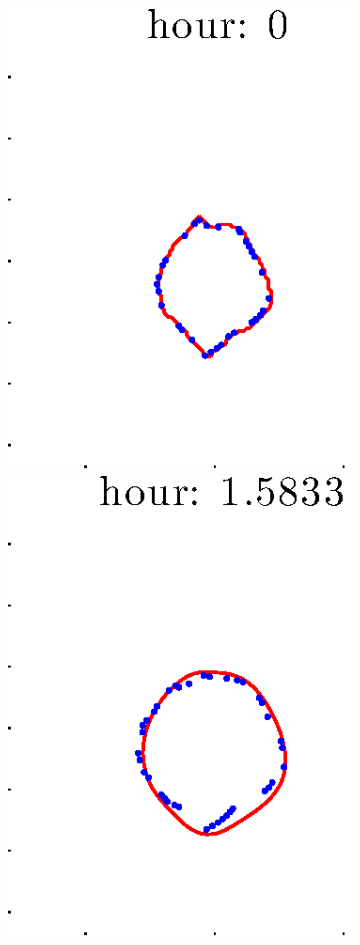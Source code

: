 \documentclass[12pt]{article}
\begin{document}
\begin{figure}[h!]
\centering
	\begin{subfigure}[b]{.3\textwidth}
	\centering
		\includegraphics[height=.15\textheight]{Pos14exp8/full/full1.eps}
		\includegraphics[height=.15\textheight]{Pos14exp8/full/full2.eps}

\end{subfigure}
\end{figure}
\end{document}
